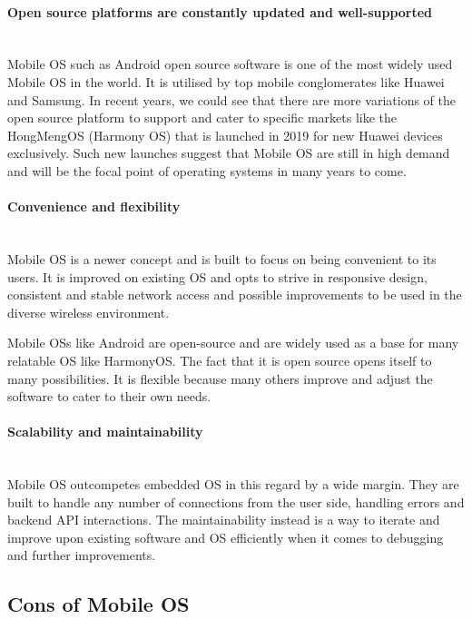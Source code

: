 \documentclass[conference]{IEEEtran}
\newcommand{\forceindent}{\leavevmode{\parindent=1em\indent}}
\begin{document}
\paragraph{Open source platforms are constantly updated and well-supported} \mbox{} \\
\forceindent Mobile OS such as Android open source software is one of the most widely used Mobile OS in the world. It is utilised by top mobile conglomerates like Huawei and Samsung. In recent years, we could see that there are more variations of the open source platform to support and cater to specific markets like the HongMengOS (Harmony OS) that is launched in 2019 for new Huawei devices exclusively\cite{HuaweiHongmeng}. Such new launches suggest that Mobile OS are still in high demand and will be the focal point of operating systems in many years to come.

\medskip
\paragraph{Convenience and flexibility} \mbox{} \\
\forceindent Mobile OS is a newer concept and is built to focus on being convenient to its users. It is improved on existing OS and opts to strive in responsive design, consistent and stable network access and possible improvements to be used in the diverse wireless environment\cite{technopedia}.

\smallskip
\forceindent Mobile OSs like Android are open-source and are widely used as a base for many relatable OS like HarmonyOS. The fact that it is open source opens itself to many possibilities. It is flexible because many others improve and adjust the software to cater to their own needs.

\medskip
\paragraph{Scalability and maintainability}\mbox{} \\
\forceindent Mobile OS outcompetes embedded OS in this regard by a wide margin. They are built to handle any number of connections from the user side, handling errors and backend API interactions\cite{mediumScalability}. The maintainability instead is a way to iterate and improve upon existing software and OS efficiently when it comes to debugging and further improvements.\\

\subsection{Cons of Mobile OS}
\end{document}
